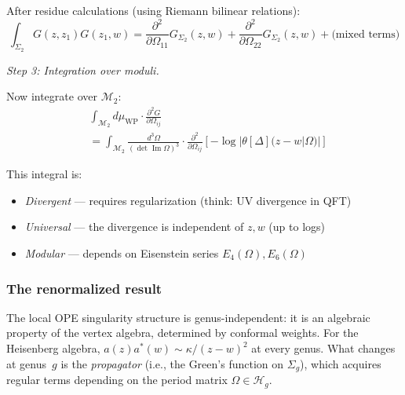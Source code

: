 After residue calculations (using Riemann bilinear relations):
\[\int_{\Sigma_2} G(z, z_1) G(z_1, w) = 
\frac{\partial^2}{\partial \Omega_{11}} G_{\Sigma_2}(z, w) 
+ \frac{\partial^2}{\partial \Omega_{22}} G_{\Sigma_2}(z, w)
+ \text{(mixed terms)}\]

\emph{Step 3: Integration over moduli.}

Now integrate over $\mathcal{M}_2$:
\begin{align}
&\int_{\mathcal{M}_2} d\mu_{\text{WP}} \cdot 
\frac{\partial^2 G}{\partial \Omega_{ij}} \\
&= \int_{\mathcal{M}_2} \frac{d^3\Omega}{(\det \operatorname{Im} \Omega)^{3}}
\cdot \frac{\partial^2}{\partial \Omega_{ij}} 
\left[ -\log|\theta[\Delta](z-w|\Omega)| \right]
\end{align}

This integral is:
\begin{itemize}
\item \emph{Divergent} --- requires regularization (think: UV divergence in QFT)
\item \emph{Universal} --- the divergence is independent of $z, w$ (up to logs)
\item \emph{Modular} --- depends on Eisenstein series $E_4(\Omega), E_6(\Omega)$
\end{itemize}

\subsubsection{The renormalized result}

\begin{remark}\label{rem:ope-genus-independent}
The local OPE singularity structure is genus-independent: it is an algebraic property
of the vertex algebra, determined by conformal weights. For the Heisenberg algebra,
$a(z)a^*(w) \sim \kappa/(z-w)^2$ at every genus. What changes at genus~$g$ is the
\emph{propagator} (i.e., the Green's function on $\Sigma_g$), which acquires regular
terms depending on the period matrix $\Omega \in \mathcal{H}_g$.
\end{remark}

